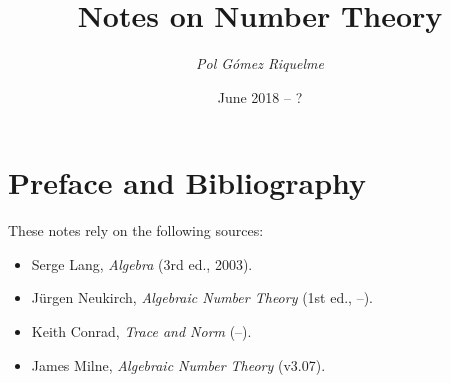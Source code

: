\documentclass[12pt,oneside]{article}
\begin{document}
\title{Notes on Number Theory}
\author{\small\textit{Pol Gómez Riquelme}}
\date{June 2018 -- ?}
\maketitle

\tableofcontents
\pagebreak

\section*{Preface and Bibliography}

These notes rely on the following sources:
\begin{itemize}
	\item Serge Lang, \emph{Algebra} (3rd ed., 2003).
	\item Jürgen Neukirch, \emph{Algebraic Number Theory} (1st ed., --).
	\item Keith Conrad, \emph{Trace and Norm} (--).
	\item James Milne, \emph{Algebraic Number Theory} (v3.07).
\end{itemize}

\pagebreak





\end{document}

